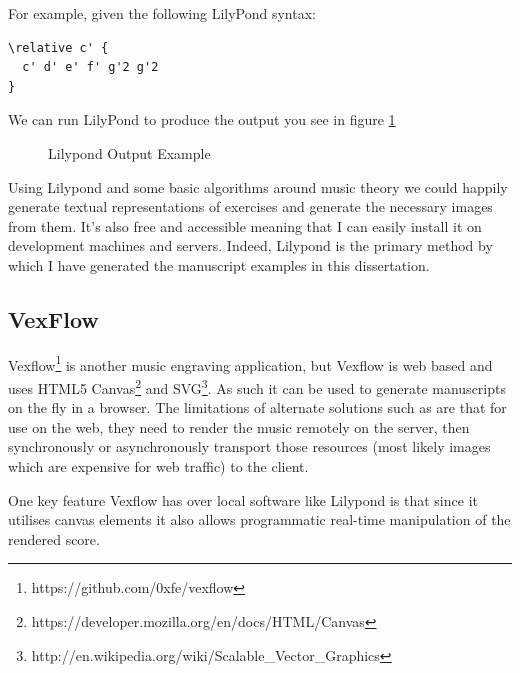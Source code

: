For example, given the following LilyPond syntax:

\begin{lstlisting}
\relative c' {
  c' d' e' f' g'2 g'2
}
\end{lstlisting}

We can run LilyPond to produce the output you see in figure \ref{fig:lilypond-output}

\begin{figure}[h!]
  \centering
  \caption{Lilypond Output Example}
  \label{fig:lilypond-output}
\end{figure}

Using Lilypond and some basic algorithms around music theory we could happily generate textual representations of exercises and generate the necessary images from them. It's also free and accessible meaning that I can easily install it on development machines and servers. Indeed, Lilypond is the primary method by which I have generated the manuscript examples in this dissertation.

\subsection*{VexFlow}

Vexflow\footnote{https://github.com/0xfe/vexflow} is another music engraving application, but Vexflow is web based and uses HTML5 Canvas\footnote{https://developer.mozilla.org/en/docs/HTML/Canvas} and SVG\footnote{http://en.wikipedia.org/wiki/Scalable\_Vector\_Graphics}. As such it can be used to generate manuscripts on the fly in a browser. The limitations of alternate solutions such as  are that for use on the web, they need to render the music remotely on the server, then synchronously or asynchronously transport those resources (most likely images which are expensive for web traffic) to the client.

One key feature Vexflow has over local software like Lilypond is that since it utilises canvas elements it also allows programmatic real-time manipulation of the rendered score.

